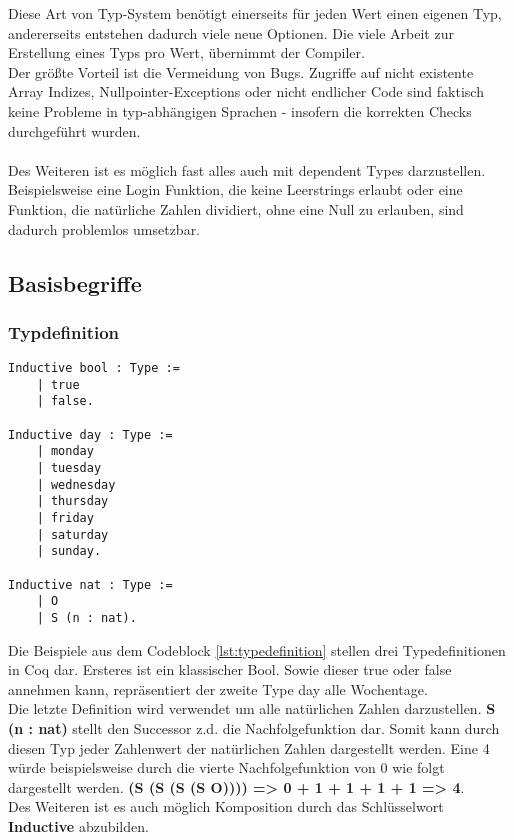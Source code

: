 Diese Art von Typ-System benötigt einerseits für jeden Wert einen eigenen Typ, andererseits entstehen dadurch viele neue Optionen. Die viele Arbeit zur Erstellung eines Typs pro Wert, übernimmt der Compiler.\\
Der größte Vorteil ist die Vermeidung von Bugs. Zugriffe auf nicht existente Array Indizes, Nullpointer-Exceptions oder nicht endlicher Code sind faktisch keine Probleme in typ-abhängigen Sprachen - insofern die korrekten Checks durchgeführt wurden.\\
\\
Des Weiteren ist es möglich fast alles auch mit dependent Types darzustellen. Beispielsweise eine Login Funktion, die keine Leerstrings erlaubt oder eine Funktion, die natürliche Zahlen dividiert, ohne eine Null zu erlauben, sind dadurch problemlos umsetzbar.
\subsection{Basisbegriffe}
\subsubsection{Typdefinition}
\begin{lstlisting}[language=coq,firstnumber=1,caption=Coq Typedefinition,label=lst:typedefinition]
Inductive bool : Type :=
	| true
	| false.
	
Inductive day : Type :=
	| monday
	| tuesday
	| wednesday
	| thursday
	| friday
	| saturday
	| sunday.
	
Inductive nat : Type :=
	| O
	| S (n : nat).
\end{lstlisting}

Die Beispiele aus dem Codeblock \ref{lst:typedefinition} stellen drei Typedefinitionen in Coq dar. Ersteres ist ein klassischer Bool. Sowie dieser true oder false annehmen kann, repräsentiert der zweite Type day alle Wochentage. \\
Die letzte Definition wird verwendet um alle natürlichen Zahlen darzustellen. \textbf{S (n : nat)} stellt den Successor z.d. die Nachfolgefunktion dar. Somit kann durch diesen Typ jeder Zahlenwert der natürlichen Zahlen dargestellt werden. Eine 4 würde beispielsweise durch die vierte Nachfolgefunktion von 0 wie folgt dargestellt werden. \textbf{(S (S (S (S O)))) => 0 + 1 + 1 + 1 + 1 => 4}.\\
Des Weiteren ist es auch möglich Komposition durch das Schlüsselwort \textbf{Inductive} abzubilden.

